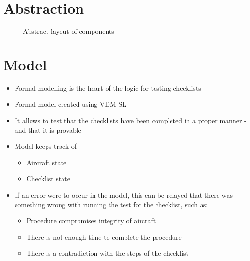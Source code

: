 \documentclass[../dissertation.tex]{subfiles}
\begin{document}
\section{Abstraction}
\begin{figure}[!h]
\centering
  \caption{Abstract layout of components}
\end{figure}

\section{Model}
\begin{itemize}
  \item Formal modelling is the heart of the logic for testing checklists
  \item Formal model created using VDM-SL
  \item It allows to test that the checklists have been completed in a proper manner
    - and that it is provable
  \item Model keeps track of
    \begin{itemize}
      \item Aircraft state
      \item Checklist state
    \end{itemize}
  \item If an error were to occur in the model, this can be relayed that there was
    something wrong with running the test for the checklist, such as:
    \begin{itemize}
      \item Procedure compromises integrity of aircraft
      \item There is not enough time to complete the procedure
      \item There is a contradiction with the steps of the checklist
    \end{itemize}
\end{itemize}
\end{document}
